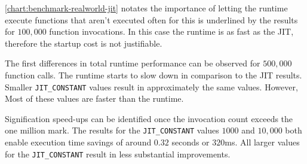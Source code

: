 \autoref{chart:benchmark-realworld-jit} notates the importance of letting the
runtime execute functions that aren't executed often for this is underlined by
the results for $100,000$ function invocations. In this case the runtime is as
fast as the JIT, therefore the startup cost is not justifiable. 

The first differences in total runtime performance can be observed for
$500,000$ function calls. The runtime starts to slow down in comparison to the
JIT results. Smaller \texttt{JIT\_CONSTANT} values result in approximately the
same values. However, Most of these values are faster than the runtime. 

Signification speed-ups can be identified once the invocation count exceeds the
one million mark. The results for the \texttt{JIT\_CONSTANT} values $1000$ and
$10,000$ both enable execution time savings of around $0.32$ seconds or
$320$ms. All larger values for the \texttt{JIT\_CONSTANT} result in less
substantial improvements.

